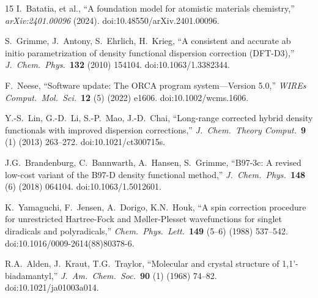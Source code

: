 \documentclass[10pt,twocolumn,a4paper]{article}
\begin{document}
\begin{thebibliography}{15}
I.~Batatia, et al., ``A foundation model for atomistic materials chemistry,'' \textit{arXiv:2401.00096} (2024). doi:10.48550/arXiv.2401.00096.

S.~Grimme, J.~Antony, S.~Ehrlich, H.~Krieg, ``A consistent and accurate ab initio parametrization of density functional dispersion correction (DFT-D3),'' \textit{J.\ Chem.\ Phys.}\ \textbf{132} (2010) 154104. doi:10.1063/1.3382344.

F.~Neese, ``Software update: The ORCA program system---Version 5.0,'' \textit{WIREs Comput.\ Mol.\ Sci.}\ \textbf{12} (5) (2022) e1606. doi:10.1002/wcms.1606.

Y.-S.~Lin, G.-D.~Li, S.-P.~Mao, J.-D.~Chai, ``Long-range corrected hybrid density functionals with improved dispersion corrections,'' \textit{J.\ Chem.\ Theory Comput.}\ \textbf{9} (1) (2013) 263--272. doi:10.1021/ct300715s.

J.G.~Brandenburg, C.~Bannwarth, A.~Hansen, S.~Grimme, ``B97-3c: A revised low-cost variant of the B97-D density functional method,'' \textit{J.\ Chem.\ Phys.}\ \textbf{148} (6) (2018) 064104. doi:10.1063/1.5012601.

K.~Yamaguchi, F.~Jensen, A.~Dorigo, K.N.~Houk, ``A spin correction procedure for unrestricted Hartree-Fock and M\o ller-Plesset wavefunctions for singlet diradicals and polyradicals,'' \textit{Chem.\ Phys.\ Lett.}\ \textbf{149} (5--6) (1988) 537--542. doi:10.1016/0009-2614(88)80378-6.

R.A.~Alden, J.~Kraut, T.G.~Traylor, ``Molecular and crystal structure of 1,1'-biadamantyl,'' \textit{J.\ Am.\ Chem.\ Soc.}\ \textbf{90} (1) (1968) 74--82. doi:10.1021/ja01003a014.

\end{thebibliography}
\end{document}
